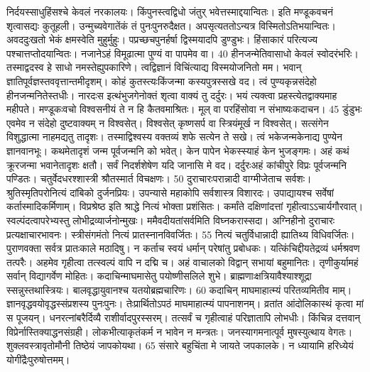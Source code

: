 निर्दयस्साधुहिंसश्चे केवलं नरकालयः।
 किंपुनस्त्वद्विधो जंतुर् भवेत्तस्माद्दयान्वितः।
 इति मण्डूकवचनं शृत्वासद्यः कुतूहली।
 उन्मुच्यवेगातेंकं तं पुनःपुनरुदैक्षत।
 अपसृत्यततोऽन्यत्र विस्मितोऽतिभयान्वितः।
 अवददुःखतो भेकं क्षमस्वेति मुहुर्मुहुः।
 पप्रच्छचपुनर्हर्षा द्विस्मयादपि डुण्डुभः।
 हिंसाकारं परित्यज्य पश्चात्तप्तोदयान्वितः।
 नजानेऽहं विमूढात्मा पुण्यं वा पापमेव वा।
 40 हीनजन्मेतिवासाधो केवलं स्वोदरंभरिः।
 तस्माद्वदस्व हे साधो नमस्तेह्युपकारिणे।
 त्वद्विज्ञानं विचिंत्याद्य विस्मयोजनितो मम।
 भवान् ज्ञातिपूर्वज्ञस्तववृत्तान्तमीदृशम्।
 कोहं कुतस्त्यःकिंजन्मा कस्यपुत्रस्सखे वद।
 त्वं पुण्यकृन्नसंदेहो हीनजन्मनितेस्तधीः।
 नारदःस इत्थंभुजगेनोक्तं शृत्वा वाक्यं तु दर्दुरः।
 भयं त्यक्त्वा प्रहस्त्येतद्वाक्यमाह महीपते।
 मण्डूकःवचो विश्वसनीयं ते न हि कैतवमाश्रितः।
 मूल् वा परहिंसोवा न संभाष्यःकदाचन।
 45 डुंडुभः
एवमेव न संदेहो दुष्टवाक्यम् न विश्वसेत्।
 विश्वसेत् कृष्णसर्प वा स्त्रियंमूर्ख न विश्वसेत्।
 सत्संगेन विशुद्धात्मा नाहमद्यतु तादृशः।
 तस्माद्विश्वस्य वक्तव्यं शफे सत्येन ते सखे।
 त्वं भकेजन्मकेनाद्य पुण्येन ज्ञानवानभूः।
 कथमेतादृशं जन्म पूर्वजन्मनि को भवेत्।
 केन पापेन भेकस्स्याहं केन भुजङ्गमः।
 अहं कथं क्रूरजन्मा भवानेतादृशः क्षतौ।
 सर्वं निदर्शशेषेण यदि जानासि मे वद।
 दर्दुरःअहं कांचीपुरे विप्रः पूर्वजन्मनि पण्डितः।
 चतुर्वेदधरश्शास्त्री श्रौतस्मार्त विचक्षणः।
 50 दुराचारःपरान्नादी वाग्मीजेताच सर्वशः।
 श्रुतिस्मृतिपरोनित्यं दांबिको दुर्जनप्रियः।
 उपन्यासे महाकोपि सर्वशास्त्र विशारदः।
 उपाद्यायश्च सर्वेषां कर्तास्मादिकर्मिणाम्।
 विप्रश्रेष्ठ इति श्राद्धे नित्यं भोक्ता प्रशंसितः।
 कर्मांते दक्षिणांदत्तां गृहीत्वाऽऽचार्यगौरवात्।
 स्वल्पंदत्वापरेभ्यस्तु लोभीद्रव्यार्जनोन्मुखः।
 ममैवदीयतांसर्वमिति विघ्नकरास्सदा।
 अग्निहीनो दुराचारः प्रत्यक्षाचारभावनः।
 स्त्रीसंगमंतो नित्यं प्रातस्नानविवर्जितः।
 55
नित्यं चतुर्विधान्नादी ह्यातिथ्य विधिवर्जितः।
 पुराणवक्ता सर्वत्र प्रातःकाले मठादिषु।
 न कर्ताच स्वयं धर्मान् परेषांतु प्रबोधकः।
 यत्किंचिद्दीयतेद्रव्यं धर्मश्रवण तत्परैः।
 अहमेव गृहीत्वा तत्स्वल्पं वापि न दद्मि च।
 अहं वाचालको विद्वान् सभायां बहुमानितः।
 तृणीकुर्यामहं सर्वान् विद्यागर्वेण मोहितः।
 कदाचिन्माघमासेतु पयोष्णीसलिले शुभे।
 ब्राह्मणाःक्षत्रियावैश्याश्शूद्रा स्सन्नुस्तथास्त्रियः।
 बालवृद्धायुवानश्च यतयोब्रह्मचारिणः।
 60 कदाचिन् माघमाहात्म्यं परितव्यमितीव माम्।
 ज्ञानवृद्धवयोवृद्धस्संप्रशस्य पुनःपुनः।
 तेःप्रार्थितोऽपठं माघमाहात्म्यं पापनाशनम्।
 व्रतांत आंदोलिकास्थं कृत्वा मां स पूजयन्।
 धनरत्नांबरैर्दिव्यै राशीर्वादपुरस्सरम्।
 तत्सर्वं च गृहीत्वाहं परिज्ञातापि लोभधीः।
 किंचिन्न दत्तवान् विप्रेर्नास्तिक्याद्धनसंग्रही।
 लोकभीत्याकृतंकर्म न भावेन न मन्त्रतः।
 जनस्यागमनात्पूर्व मुषस्युत्थाय वेगतः।
 शुक्लवस्त्रावृतोमौनी तिष्ठेयं जापकोयथा।
 65 संसारे बहुचिंता मे जायते जपकालके।
 न ध्यायामि हरिध्येयं योगींद्रैःपुरुषोत्तमम्।
 
